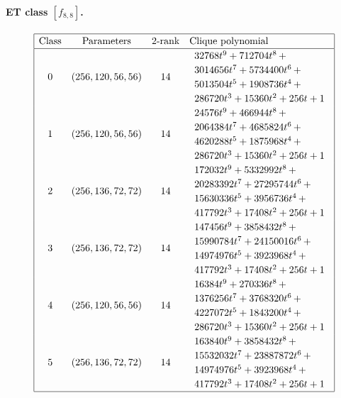 \documentclass[12pt,a4paper]{article}
\begin{document}
\paragraph*{ET class $[f_{8,8}]$.}
\small{}
\begin{align*}
\def\arraystretch{1.2}
\begin{array}{|cccl|}
\hline
\text{Class} &
\text{Parameters} &
\text{2-rank} &
\text{Clique polynomial}
\\
\hline
0 &
(256, 120, 56, 56) &
14 &
\begin{array}{l}
32768t^{9} + 712704t^{8}
\,+
\\
 3014656t^{7} + 5734400t^{6}
\,+
\\
 5013504t^{5} + 1908736t^{4}
\,+
\\
 286720t^{3} + 15360t^{2} + 256t + 1
\end{array}
\\
1 &
(256, 120, 56, 56) &
14 &
\begin{array}{l}
24576t^{9} + 466944t^{8}
\,+
\\
 2064384t^{7} + 4685824t^{6}
\,+
\\
 4620288t^{5} + 1875968t^{4}
\,+
\\
 286720t^{3} + 15360t^{2} + 256t + 1
\end{array}
\\
2 &
(256, 136, 72, 72) &
14 &
\begin{array}{l}
172032t^{9} + 5332992t^{8}
\,+
\\
 20283392t^{7} + 27295744t^{6}
\,+
\\
 15630336t^{5} + 3956736t^{4}
\,+
\\
 417792t^{3} + 17408t^{2} + 256t + 1
\end{array}
\\
3 &
(256, 136, 72, 72) &
14 &
\begin{array}{l}
147456t^{9} + 3858432t^{8}
\,+
\\
 15990784t^{7} + 24150016t^{6}
\,+
\\
 14974976t^{5} + 3923968t^{4}
\,+
\\
 417792t^{3} + 17408t^{2} + 256t + 1
\end{array}
\\
4 &
(256, 120, 56, 56) &
14 &
\begin{array}{l}
16384t^{9} + 270336t^{8}
\,+
\\
 1376256t^{7} + 3768320t^{6}
\,+
\\
 4227072t^{5} + 1843200t^{4}
\,+
\\
 286720t^{3} + 15360t^{2} + 256t + 1
\end{array}
\\
5 &
(256, 136, 72, 72) &
14 &
\begin{array}{l}
163840t^{9} + 3858432t^{8}
\,+
\\
 15532032t^{7} + 23887872t^{6}
\,+
\\
 14974976t^{5} + 3923968t^{4}
\,+
\\
 417792t^{3} + 17408t^{2} + 256t + 1
\end{array}
\\
\hline
\end{array}
\end{align*}
\end{document}
